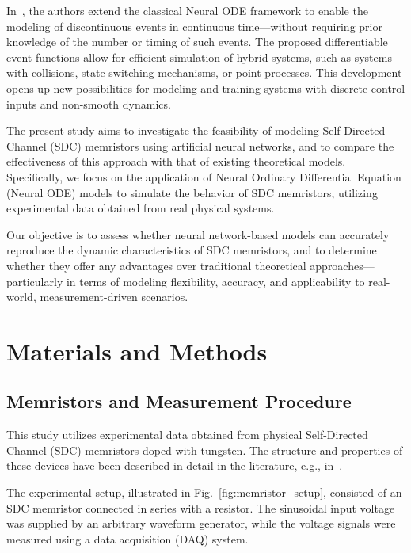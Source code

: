 \documentclass[11pt, oneside]{article}
\begin{document}
In~\cite{Ricky2021}, the authors extend the classical Neural ODE framework to enable the modeling of discontinuous events in continuous time—without requiring prior knowledge of the number or timing of such events. The proposed differentiable event functions allow for efficient simulation of hybrid systems, such as systems with collisions, state-switching mechanisms, or point processes. This development opens up new possibilities for modeling and training systems with discrete control inputs and non-smooth dynamics.


The present study aims to investigate the feasibility of modeling Self-Directed Channel (SDC) memristors using artificial neural networks, and to compare the effectiveness of this approach with that of existing theoretical models. Specifically, we focus on the application of Neural Ordinary Differential Equation (Neural ODE) models to simulate the behavior of SDC memristors, utilizing experimental data obtained from real physical systems.

Our objective is to assess whether neural network-based models can accurately reproduce the dynamic characteristics of SDC memristors, and to determine whether they offer any advantages over traditional theoretical approaches—particularly in terms of modeling flexibility, accuracy, and applicability to real-world, measurement-driven scenarios.

\section{Materials and Methods}


\subsection{Memristors and Measurement Procedure}

This study utilizes experimental data obtained from physical Self-Directed Channel (SDC) memristors doped with tungsten. The structure and properties of these devices have been described in detail in the literature, e.g., in~\cite{Garda2024, Campbell2017}.

The experimental setup, illustrated in Fig.~\ref{fig:memristor_setup}, consisted of an SDC memristor connected in series with a resistor. The sinusoidal input voltage was supplied by an arbitrary waveform generator, while the voltage signals were measured using a data acquisition (DAQ) system.
\end{document}
